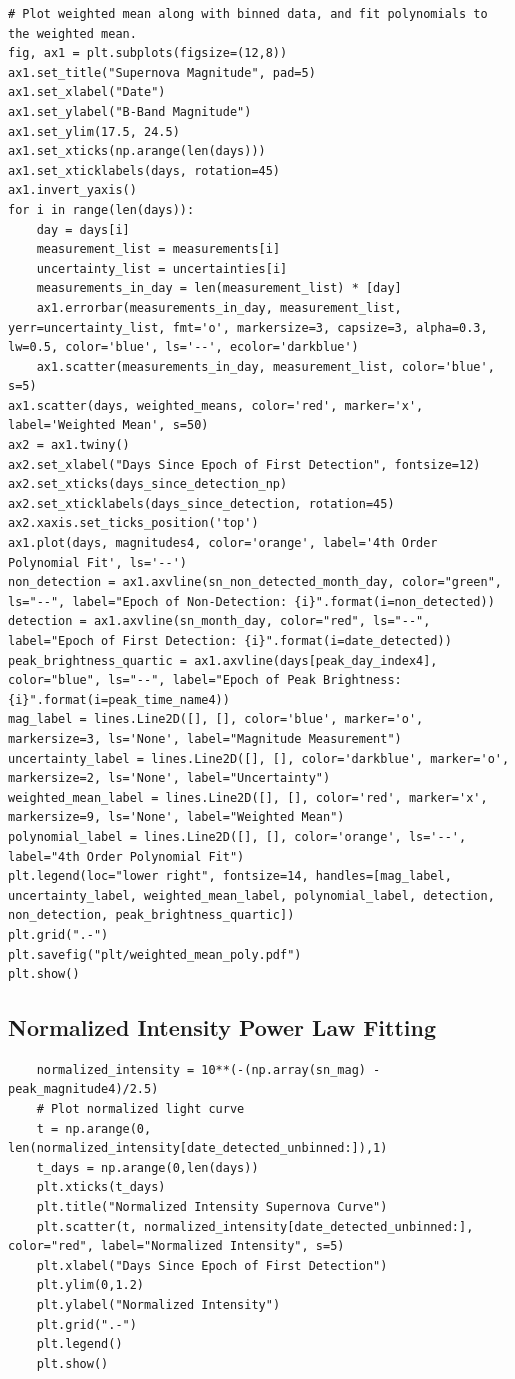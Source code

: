 \documentclass{article}
\begin{document}
\begin{appendices}
\begin{verbatim}
# Plot weighted mean along with binned data, and fit polynomials to the weighted mean.
fig, ax1 = plt.subplots(figsize=(12,8))
ax1.set_title("Supernova Magnitude", pad=5)
ax1.set_xlabel("Date")
ax1.set_ylabel("B-Band Magnitude")
ax1.set_ylim(17.5, 24.5)
ax1.set_xticks(np.arange(len(days)))
ax1.set_xticklabels(days, rotation=45)
ax1.invert_yaxis()
for i in range(len(days)):
    day = days[i]
    measurement_list = measurements[i]
    uncertainty_list = uncertainties[i]
    measurements_in_day = len(measurement_list) * [day]
    ax1.errorbar(measurements_in_day, measurement_list, yerr=uncertainty_list, fmt='o', markersize=3, capsize=3, alpha=0.3, lw=0.5, color='blue', ls='--', ecolor='darkblue')
    ax1.scatter(measurements_in_day, measurement_list, color='blue', s=5)
ax1.scatter(days, weighted_means, color='red', marker='x', label='Weighted Mean', s=50)
ax2 = ax1.twiny()
ax2.set_xlabel("Days Since Epoch of First Detection", fontsize=12)
ax2.set_xticks(days_since_detection_np)
ax2.set_xticklabels(days_since_detection, rotation=45)
ax2.xaxis.set_ticks_position('top')
ax1.plot(days, magnitudes4, color='orange', label='4th Order Polynomial Fit', ls='--')
non_detection = ax1.axvline(sn_non_detected_month_day, color="green", ls="--", label="Epoch of Non-Detection: {i}".format(i=non_detected))
detection = ax1.axvline(sn_month_day, color="red", ls="--", label="Epoch of First Detection: {i}".format(i=date_detected))
peak_brightness_quartic = ax1.axvline(days[peak_day_index4], color="blue", ls="--", label="Epoch of Peak Brightness: {i}".format(i=peak_time_name4))
mag_label = lines.Line2D([], [], color='blue', marker='o', markersize=3, ls='None', label="Magnitude Measurement")
uncertainty_label = lines.Line2D([], [], color='darkblue', marker='o', markersize=2, ls='None', label="Uncertainty")
weighted_mean_label = lines.Line2D([], [], color='red', marker='x', markersize=9, ls='None', label="Weighted Mean")
polynomial_label = lines.Line2D([], [], color='orange', ls='--', label="4th Order Polynomial Fit")
plt.legend(loc="lower right", fontsize=14, handles=[mag_label, uncertainty_label, weighted_mean_label, polynomial_label, detection, non_detection, peak_brightness_quartic])
plt.grid(".-")
plt.savefig("plt/weighted_mean_poly.pdf")
plt.show()
\end{verbatim}

\subsection{Normalized Intensity Power Law Fitting}
\begin{verbatim}
    normalized_intensity = 10**(-(np.array(sn_mag) - peak_magnitude4)/2.5)
    # Plot normalized light curve
    t = np.arange(0, len(normalized_intensity[date_detected_unbinned:]),1)
    t_days = np.arange(0,len(days))
    plt.xticks(t_days)
    plt.title("Normalized Intensity Supernova Curve")
    plt.scatter(t, normalized_intensity[date_detected_unbinned:], color="red", label="Normalized Intensity", s=5)
    plt.xlabel("Days Since Epoch of First Detection")
    plt.ylim(0,1.2)
    plt.ylabel("Normalized Intensity")
    plt.grid(".-")
    plt.legend()
    plt.show()
    

\end{verbatim}
\end{appendices}
\end{document}
